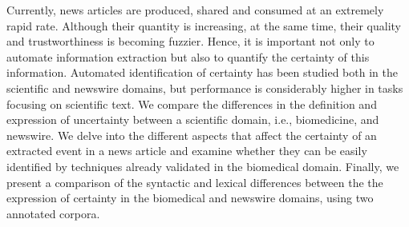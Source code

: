Currently, news articles are produced, shared and consumed at an extremely  rapid rate. Although their quantity is increasing, at  the same time, their quality and trustworthiness is becoming fuzzier. Hence, it is important not only to automate information extraction but also to quantify the certainty of  this information. Automated identification of certainty has been  studied both in the scientific and newswire domains, but performance is considerably higher in tasks focusing on scientific text. We compare the differences in the definition and expression of uncertainty between a scientific domain, i.e., biomedicine, and newswire. We delve into the different aspects that affect the certainty of an extracted event in a news article and examine whether they can be easily identified by techniques already validated in the biomedical domain. Finally, we present a comparison of the syntactic and lexical differences between the the expression of certainty in the biomedical and newswire domains, using two annotated corpora.
